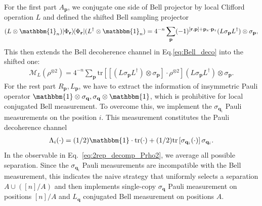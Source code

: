 \documentclass[aps,%
twocolumn,%
floatfix,%
pra,%
amsfonts,%
groupedaddress,%
superscriptaddress]{revtex4-2}%
\newcommand{\bra}[1]{\langle #1\rvert}
\newcommand{\ket}[1]{\lvert #1\rangle}
\newcommand{\1}{\mathbbm{1}}
\begin{document}
For the first part $A_{\mathbf{p}}$, we conjugate one side of Bell projector by local Clifford operation $L$ and defined the shifted Bell sampling projector
\begin{align}
    (L \otimes \1_n)\ket{\Phi_{\mathbf{r}}}\!\bra{\Phi_{\mathbf{r}}}(L^\dagger \otimes \1_n) = 4^{-n}\sum_{\mathbf{p}} (-1)^{[\mathbf{r}, \mathbf{p}] + \mathbf{p}_x\cdot \mathbf{p}_z}(L\sigma_{\mathbf{p}}L^{\dagger}) \otimes \sigma_{\mathbf{p}},
\end{align}
 This then extends the Bell decoherence channel in Eq.\eqref{eq:Bell_deco} into the shifted one:
\begin{align}
\label{eq:Shif_Bell_deco}
    \mathcal{M}_{L}(\rho^{\otimes 2}) = 4^{-n}\sum_{\mathbf{p}}\mathrm{tr}\left[\left[(L\sigma_{\mathbf{p}}L^{\dagger}) \otimes \sigma_{\mathbf{p}}\right]\cdot\rho^{\otimes 2}\right](L\sigma_{\mathbf{p}}L^{\dagger}) \otimes \sigma_{\mathbf{p}}.
\end{align}
For the rest part $R_{\mathbf{p}},L_{\mathbf{p}}$, we have to extract the information of insymmetric Pauli operator $\1 \otimes \sigma_{\mathbf{q}}, \sigma_{\mathbf{q}} \otimes \1$, which is prohibitive for local conjugated Bell measurement.
To overcome this, we implement the $\sigma_{\mathbf{q}_i}$ Pauli measurements on the position $i$.
This measurement constitutes the Pauli decoherence channel
\begin{align}
    \Lambda_{i}(\cdot ) = (1/2)\1\cdot\mathrm{tr}(\cdot) + (1/2)\mathrm{tr}\left[\sigma_{\mathbf{q}_i} (\cdot)\right] \sigma_{\mathbf{q}_i}.
\end{align}
In the observable in Eq.~\eqref{eq:2rep_decomp_Prho2}, we average all possible separation.
Since the $\sigma_{\mathbf{q}_i}$ Pauli measurements are incompatible with the Bell measurement,  this indicates the naive strategy that uniformly selects a separation $A \cup ([n]/A)$ and then implements single-copy $\sigma_{\mathbf q}$ Pauli measurement on positions $[n]/A$ and $L_{\mathbf q}$ conjugated Bell measurement on positions $A$.
\end{document}
